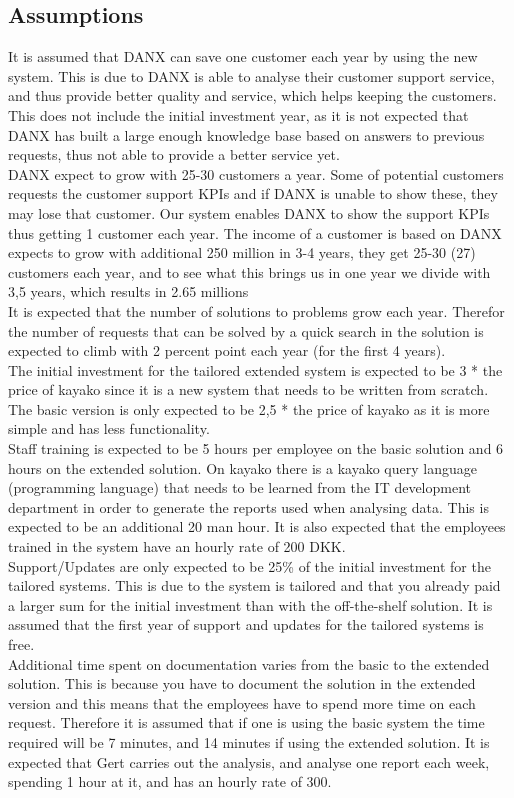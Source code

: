 \subsection{Assumptions}
\label{subsub:assumptions}
It is assumed that DANX can save one customer each year by using the new system. This is due to DANX is able to analyse their customer support service, and thus provide better quality and service, which helps keeping the customers. This does not include the initial investment year, as it is not expected that DANX has built a large enough knowledge base based on answers to previous requests, thus not able to provide a better service yet.\\
DANX expect to grow with 25-30 customers a year.\cite{bob003} Some of potential customers requests the customer support KPIs and if DANX is unable to show these, they may lose that customer. Our system enables DANX to show the support KPIs thus getting 1 customer each year. The income of a customer is based on DANX expects to grow with additional 250 million in 3-4 years, they get 25-30 (27) customers each year, and to see what this brings us in one year we divide with 3,5 years, which results in 2.65 millions\\
It is expected that the number of solutions to problems grow each year. Therefor the number of requests that can be solved by a quick search in the solution is expected to climb with 2 percent point each year (for the first 4 years). \\
The initial investment for the tailored extended system is expected to be 3 * the price of kayako since it is a new system that needs to be written from scratch. The basic version is only expected to be 2,5 * the price of kayako as it is more simple and has less functionality. \\
Staff training is expected to be 5 hours per employee on the basic solution and 6 hours on the extended solution. On kayako there is a kayako query\cite{webpage009} language (programming language) that needs to be learned from the IT development department in order to generate the reports used when analysing data. This is expected to be an additional 20 man hour.
It is also expected that the employees trained in the system have an hourly rate of 200 DKK.\\
Support/Updates are only expected to be 25\% of the initial investment for the tailored systems. This is due to the system is tailored and that you already paid a larger sum for the initial investment than with the off-the-shelf solution. It is assumed that the first year of support and updates for the tailored systems is free. \\
Additional time spent on documentation varies from the basic to the extended solution. This is because you have to document the solution in the extended version and this means that the employees have to spend more time on each request.
Therefore it is assumed that if one is using the basic system the time required will be 7 minutes, and 14 minutes if using the extended solution. 
It is expected that Gert carries out the analysis, and analyse one report each week, spending 1 hour at it, and has an hourly rate of 300. \\


